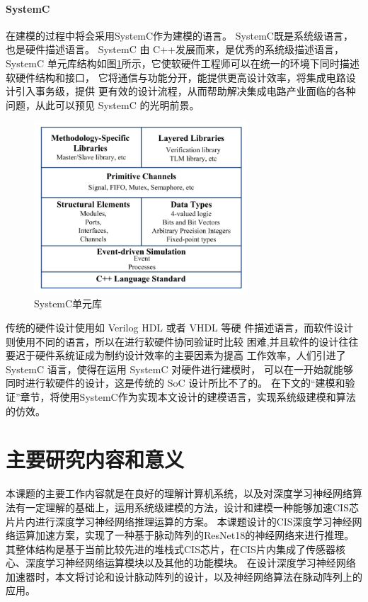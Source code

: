 \paragraph{SystemC}
在建模的过程中将会采用SystemC作为建模的语言。
SystemC既是系统级语言，也是硬件描述语言。
SystemC 由 C++发展而来，是优秀的系统级描述语言，SystemC 单元库结构如图\ref{fig:systemc_libs}所示，它使软硬件工程师可以在统一的环境下同时描述软硬件结构和接口， 它将通信与功能分开，能提供更高设计效率，将集成电路设计引入事务级，提供 更有效的设计流程，从而帮助解决集成电路产业面临的各种问题，从此可以预见 SystemC 的光明前景。

\begin{figure}[htbp]
    \centering
    \includegraphics[width=8cm]{figures/systemc_libs.png}
    \caption{SystemC单元库}
    \label{fig:systemc_libs}
\end{figure} 
传统的硬件设计使用如 Verilog HDL 或者 VHDL 等硬 件描述语言，而软件设计则使用不同的语言，所以在进行软硬件协同验证时比较 困难,并且软件的设计往往要迟于硬件系统证成为制约设计效率的主要因素为提高 工作效率，人们引进了 SystemC 语言，使得在运用 SystemC 对硬件进行建模时， 可以在一开始就能够同时进行软硬件的设计，这是传统的 SoC 设计所比不了的。
在下文的“建模和验证”章节，将使用SystemC作为实现本文设计的建模语言，实现系统级建模和算法的仿效。

\section{主要研究内容和意义}

本课题的主要工作内容就是在良好的理解计算机系统，以及对深度学习神经网络算法有一定理解的基础上，运用系统级建模的方法，设计和建模一种能够加速CIS芯片片内进行深度学习神经网络推理运算的方案。  
本课题设计的CIS深度学习神经网络运算加速方案，实现了一种基于脉动阵列的ResNet18的神经网络来进行推理。
其整体结构是基于当前比较先进的堆栈式CIS芯片，在CIS片内集成了传感器核心、深度学习神经网络运算模块以及其他的功能模块。
在设计深度学习神经网络加速器时，本文将讨论和设计脉动阵列的设计，以及神经网络算法在脉动阵列上的应用。    


